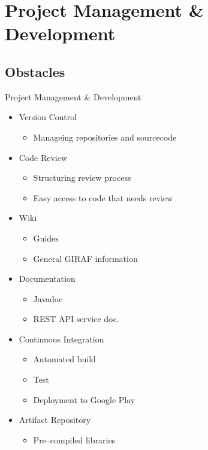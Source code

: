 \section{Project Management \& Development}
\subsection{Obstacles}
\begin{frame}{Project Management \& Development}
    \begin{itemize}
        \item Version Control
        \begin{itemize}
            \item Manageing repositories and sourcecode
        \end{itemize}
        \item Code Review
        \begin{itemize}
            \item Structuring review process
            \item Easy access to code that needs review
        \end{itemize}
        \item Wiki
        \begin{itemize}
            \item Guides
            \item General GIRAF information
        \end{itemize}
        \item Documentation
        \begin{itemize}
            \item Javadoc
            \item REST API service doc.
        \end{itemize}
        \item Continuous Integration
        \begin{itemize}
            \item Automated build
            \item Test
            \item Deployment to Google Play
        \end{itemize}
        \item Artifact Repository
        \begin{itemize}
            \item Pre--compiled libraries
        \end{itemize}
    \end{itemize}
\end{frame}

